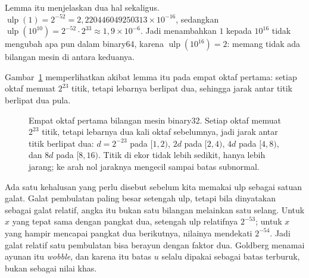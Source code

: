 Lemma itu menjelaskan dua hal sekaligus.
$\operatorname{ulp}(1)=2^{-52}=2{,}220446049250313\times10^{-16}$, sedangkan
$\operatorname{ulp}(10^{10})=2^{-52}\cdot2^{33}\approx1{,}9\times10^{-6}$. Jadi
menambahkan $1$ kepada $10^{16}$ tidak mengubah apa pun dalam binary64, karena
$\operatorname{ulp}(10^{16})=2$: memang tidak ada bilangan mesin di antara keduanya.

Gambar~\ref{fig:titikmesin} memperlihatkan akibat lemma itu pada empat oktaf
pertama: setiap oktaf memuat $2^{23}$ titik, tetapi lebarnya berlipat dua, sehingga
jarak antar titik berlipat dua pula.

\begin{figure}[htbp]
\centering
{}
\caption{Empat oktaf pertama bilangan mesin binary32. Setiap oktaf memuat $2^{23}$
titik, tetapi lebarnya dua kali oktaf sebelumnya, jadi jarak antar titik berlipat dua:
$d=2^{-23}$ pada $[1,2)$, $2d$ pada $[2,4)$, $4d$ pada $[4,8)$, dan $8d$ pada
$[8,16)$. Titik di ekor tidak lebih sedikit, hanya lebih jarang; ke arah nol jaraknya
mengecil sampai batas subnormal.}
\label{fig:titikmesin}
\end{figure}

Ada satu kehalusan yang perlu disebut sebelum kita memakai ulp sebagai satuan galat.
Galat pembulatan paling besar setengah ulp, tetapi bila dinyatakan sebagai galat
relatif, angka itu bukan satu bilangan melainkan satu selang. Untuk $x$ yang tepat
sama dengan pangkat dua, setengah ulp relatifnya $2^{-53}$; untuk $x$ yang hampir
mencapai pangkat dua berikutnya, nilainya mendekati $2^{-54}$. Jadi galat relatif satu
pembulatan bisa berayun dengan faktor dua. Goldberg menamai ayunan itu \emph{wobble}, dan
karena itu batas $u$ selalu dipakai sebagai batas terburuk, bukan sebagai nilai khas.

